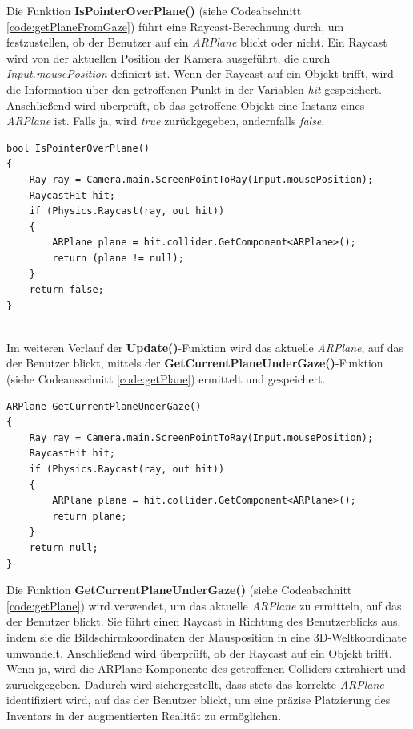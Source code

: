 Die Funktion \textbf{IsPointerOverPlane()} (siehe Codeabschnitt \ref{code:getPlaneFromGaze}) führt eine Raycast-Berechnung
durch, um festzustellen, ob der Benutzer auf ein \textit{ARPlane} blickt oder nicht. Ein Raycast wird von der aktuellen
Position der Kamera ausgeführt, die durch \textit{Input.mousePosition} definiert ist. Wenn der Raycast auf ein Objekt
trifft, wird die Information über den getroffenen Punkt in der Variablen \textit{hit} gespeichert. Anschließend wird
überprüft, ob das getroffene Objekt eine Instanz eines \textit{ARPlane} ist. Falls ja, wird \textit{true} zurückgegeben,
andernfalls \textit{false}.

\begin{lstlisting}[style=csharp, caption={Blick-Ueberpreufungs Funktion}, label=code:getPlaneFromGaze]
bool IsPointerOverPlane()
{
    Ray ray = Camera.main.ScreenPointToRay(Input.mousePosition);
    RaycastHit hit;
    if (Physics.Raycast(ray, out hit))
    {
        ARPlane plane = hit.collider.GetComponent<ARPlane>();
        return (plane != null);
    }
    return false;
}
\end{lstlisting}\\

Im weiteren Verlauf der \textbf{Update()}-Funktion wird das aktuelle \textit{ARPlane}, auf das der Benutzer blickt,
mittels der \textbf{GetCurrentPlaneUnderGaze()}-Funktion (siehe Codeausschnitt \ref{code:getPlane}) ermittelt und
gespeichert.

\begin{lstlisting}[style=csharp, caption={Das gewollte ARPlane ermitteln}, label=code:getPlane]
ARPlane GetCurrentPlaneUnderGaze()
{
    Ray ray = Camera.main.ScreenPointToRay(Input.mousePosition);
    RaycastHit hit;
    if (Physics.Raycast(ray, out hit))
    {
        ARPlane plane = hit.collider.GetComponent<ARPlane>();
        return plane;
    }
    return null;
}
\end{lstlisting}

Die Funktion \textbf{GetCurrentPlaneUnderGaze()} (siehe Codeabschnitt \ref{code:getPlane}) wird verwendet, um das aktuelle
\textit{ARPlane} zu ermitteln, auf das der Benutzer blickt. Sie führt einen Raycast in Richtung des Benutzerblicks aus,
indem sie die Bildschirmkoordinaten der Mausposition in eine 3D-Weltkoordinate umwandelt. Anschließend wird überprüft,
ob der Raycast auf ein Objekt trifft. Wenn ja, wird die ARPlane-Komponente des getroffenen Colliders extrahiert und
zurückgegeben. Dadurch wird sichergestellt, dass stets das korrekte \textit{ARPlane} identifiziert wird, auf das der
Benutzer blickt, um eine präzise Platzierung des Inventars in der augmentierten Realität zu ermöglichen.\\


